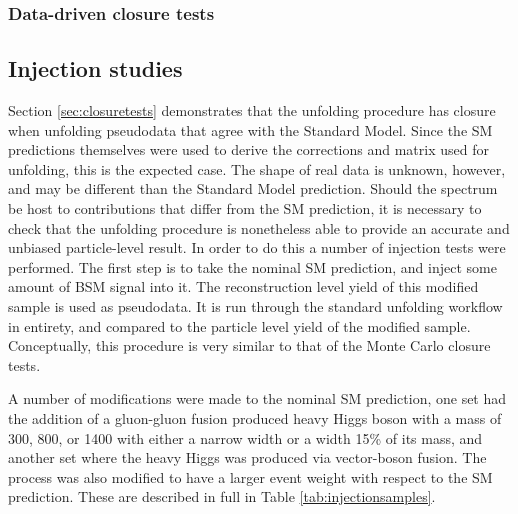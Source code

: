 
\subsubsection{Data-driven closure tests}

\subsection{Injection studies}
\label{subsec:injection}

Section \ref{sec:closuretests} demonstrates that the unfolding procedure has closure when unfolding pseudodata that agree with the Standard Model. Since the SM predictions themselves were used to derive the corrections and matrix used for unfolding, this is the expected case. The shape of real data is unknown, however, and may be different than the Standard Model prediction. Should the \mFourL spectrum be host to contributions that differ from the SM prediction, it is necessary to check that the unfolding procedure is nonetheless able to provide an accurate and unbiased particle-level result. In order to do this a number of injection tests were performed. The first step is to take the nominal SM prediction, and inject some amount of BSM signal into it. The reconstruction level yield of this modified sample is used as pseudodata. It is run through the standard unfolding workflow in entirety, and compared to the particle level yield of the modified sample. Conceptually, this procedure is very similar to that of the Monte Carlo closure tests. 

A number of modifications were made to the nominal SM prediction, one set had the addition of a gluon-gluon fusion produced heavy Higgs boson with a mass of 300, 800, or \unit{1400}{\GeV} with either a narrow width or a width 15\% of its mass, and another set where the heavy Higgs was produced via vector-boson fusion. The \ggZZ process was also modified to have a larger event weight with respect to the SM prediction. These are described in full in Table \ref{tab:injectionsamples}. 

